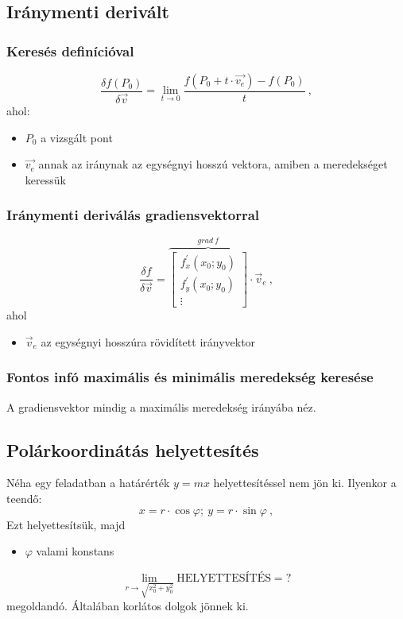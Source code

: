 \documentclass[a4paper,12pt]{article}
\begin{document}
\subsection{Iránymenti derivált}
\subsubsection{Keresés definícióval}
\begin{equation}
  \frac{\delta f(P_0)}{\delta \vec{v}} = \lim_{t \rightarrow 0} \frac{f(P_0 + t \cdot \vec{v_e}) - f(P_0)}{t}\ ,
\end{equation}
ahol:
\begin{itemize}
\item $P_0$ a vizsgált pont
\item $\vec{v_e}$ annak az iránynak az egységnyi hosszú vektora, amiben a meredekséget keressük
\end{itemize}
\subsubsection{Iránymenti deriválás gradiensvektorral}
\begin{equation}
  \frac{\delta f}{\delta \vec{v}} = \overbrace{
    \begin{bmatrix}
      f^{'}_x(x_0;y_0) \\
      f^{'}_y(x_0;y_0) \\
      \vdots
    \end{bmatrix}}^{grad\ f} \cdot \vec{v}_e \ ,
\end{equation}
ahol
\begin{itemize}
\item $\vec{v}_e$ az egységnyi hosszúra rövidített irányvektor
\end{itemize}
\subsubsection{Fontos infó maximális és minimális meredekség keresése}
A gradiensvektor mindig a maximális meredekség irányába néz.

\subsection{Polárkoordinátás helyettesítés}
Néha egy feladatban a határérték $y = mx$ helyettesítéssel nem jön ki. Ilyenkor a teendő:
\[
  x = r \cdot \cos \varphi;\ y = r \cdot \sin \varphi\ ,
\]
Ezt helyettesítsük, majd
\begin{itemize}
\item $\varphi$ valami konstans
\end{itemize}

\begin{equation}
\lim_{r \rightarrow \sqrt{x_0^2 + y_0^2}} \text{HELYETTESÍTÉS} = ?
\end{equation}
megoldandó. Általában korlátos dolgok jönnek ki.
\end{document}

